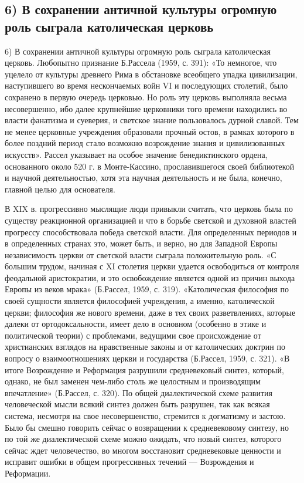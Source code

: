\subsection{6) В  сохранении античной  культуры огромную  роль сыграла
католическая церковь}

6) В  сохранении античной культуры огромную  роль сыграла католическая
церковь. Любопытно  признание Б.Рассела (1959, с.  391): «То немногое,
что уцелело  от культуры древнего  Рима в обстановке  всеобщего упадка
цивилизации, наступившего во время  нескончаемых войн VI и последующих
столетий,  было  сохранено в  первую  очередь  церковью. Но  роль  эту
церковь выполняла весьма несовершенно, ибо далее крупнейшие церковники
того времени  находились во  власти фанатизма  и суеверия,  и светское
знание пользовалось  дурной славой. Тем не  менее церковные учреждения
образовали прочный  остов, в  рамках которого  в более  поздний период
стало возможно  возрождение знания и цивилизованных  искусств». Рассел
указывает на особое значение бенедиктинского ордена, основанного около
520 г.  в Монте-Кассино,  прославившегося своей библиотекой  и научной
деятельностью,  хотя  эта научная  деятельность  и  не была,  конечно,
главной целью для основателя.

В XIX в. прогрессивно мыслящие люди привыкли считать, что церковь была
по  существу  реакционной  организацией  и что  в  борьбе  светской  и
духовной властей прогрессу способствовала  победа светской власти. Для
определенных  периодов и  в определенных  странах это,  может быть,  и
верно, но для Западной Европы  независимость церкви от светской власти
сыграла положительную роль.  «С большим трудом, начиная  с XI столетия
церкви удается освободиться от контроля феодальной аристократии, и это
освобождение является  одной из причин  выхода Европы из  веков мрака»
(Б.Рассел, 1959,  с. 319).  «Католическая философия по  своей сущности
является  философией   учреждения,  а  именно,   католической  церкви;
философия же нового  времени, даже в тех  своих разветвлениях, которые
далеки от ортодоксальности, имеет дело  в основном (особенно в этике и
политической  теории) с  проблемами,  ведущими  свое происхождение  от
христианских взглядов на нравственные законы и от католических доктрин
по вопросу о взаимоотношениях церкви и государства (Б.Рассел, 1959, с.
321).  «В  итоге  Возрождение  и  Реформация  разрушили  средневековый
синтез, который, однако, не был  заменен чем-либо столь же целостным и
производящим впечатление» (Б.Рассел, с.  320). По общей диалектической
схеме развития человеческой мысли  всякий синтез должен быть разрушен,
так как всякая  система, несмотря на свое  несовершенство, стремится к
догматизму и  застою. Было бы  смешно говорить сейчас о  возвращении к
средневековому  синтезу,  но  по  той же  диалектической  схеме  можно
ожидать,  что  новый синтез,  которого  сейчас  ждет человечество,  во
многом восстановит  средневековые ценности  и исправит ошибки  в общем
прогрессивных течений --- Возрождения и Реформации.

